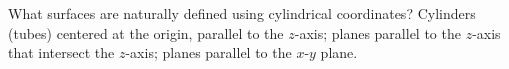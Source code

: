 {What surfaces are naturally defined using cylindrical coordinates?
}
{Cylinders (tubes) centered at the origin, parallel to the $z$-axis; planes parallel to the $z$-axis that intersect the $z$-axis; planes parallel to the $x$-$y$ plane.
}
